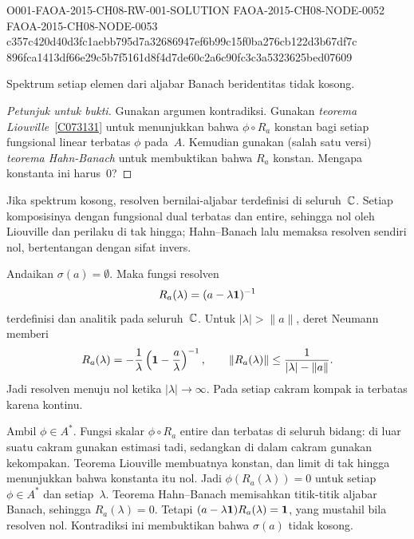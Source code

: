 \begin{o001readerwork}
  {O001-FAOA-2015-CH08-RW-001-SOLUTION}
  {FAOA-2015-CH08-NODE-0052}
  {FAOA-2015-CH08-NODE-0053}
  {c357c420d40d3fc1aebb795d7a32686947ef6b99c15f0ba276cb122d3b67df7c}
  {896fca1413df66e29c5b7f5161d8f4d7de60c2a6c90fc3c3a5323625bed07609}
\begin{o001result}
\begin{prop}\label{C073134} Spektrum setiap elemen dari aljabar Banach beridentitas tidak kosong.
\end{prop}
\end{o001result}
\begin{o001sourcehint}
\begin{proof}[\emph{Petunjuk untuk bukti}] Gunakan argumen kontradiksi. Gunakan \emph{teorema Liouville}~\ref{C073131}
untuk menunjukkan bahwa $\phi \circ R_a$ konstan bagi setiap fungsional linear terbatas $\phi$ pada~$A$. Kemudian gunakan
(salah satu versi) \emph{teorema Hahn-Banach} untuk membuktikan bahwa $R_a$ konstan. Mengapa konstanta ini harus~$0$?   \ns
\end{proof}
\end{o001sourcehint}
\begin{o001answer}
Jika spektrum kosong, resolven bernilai-aljabar terdefinisi di seluruh~$\mathbb{C}$.
Setiap komposisinya dengan fungsional dual terbatas dan entire, sehingga nol
oleh Liouville dan perilaku di tak hingga; Hahn--Banach lalu memaksa resolven
sendiri nol, bertentangan dengan sifat invers.
\end{o001answer}
\begin{o001proof}
Andaikan $\sigma(a)=\emptyset$. Maka fungsi resolven
\[
 R_a(\lambda)=(a-\lambda\mathbf{1})^{-1}
\]
terdefinisi dan analitik pada seluruh~$\mathbb{C}$. Untuk
$|\lambda|>\|a\|$, deret Neumann memberi
\[
 R_a(\lambda)
 =-\frac1\lambda\left(\mathbf{1}-\frac a\lambda\right)^{-1},
 \qquad
 \|R_a(\lambda)\|\leq\frac1{|\lambda|-\|a\|}.
\]
Jadi resolven menuju nol ketika $|\lambda|\to\infty$. Pada setiap cakram
kompak ia terbatas karena kontinu.

Ambil $\phi\in A^*$. Fungsi skalar $\phi\circ R_a$ entire dan terbatas di
seluruh bidang: di luar suatu cakram gunakan estimasi tadi, sedangkan di dalam
cakram gunakan kekompakan. Teorema Liouville membuatnya konstan, dan limit di
tak hingga menunjukkan bahwa konstanta itu nol. Jadi
$\phi(R_a(\lambda))=0$ untuk setiap $\phi\in A^*$ dan setiap~$\lambda$.
Teorema Hahn--Banach memisahkan titik-titik aljabar Banach, sehingga
$R_a(\lambda)=0$. Tetapi
$(a-\lambda\mathbf{1})R_a(\lambda)=\mathbf{1}$, yang mustahil bila resolven nol.
Kontradiksi ini membuktikan bahwa $\sigma(a)$ tidak kosong.
\end{o001proof}
\end{o001readerwork}
